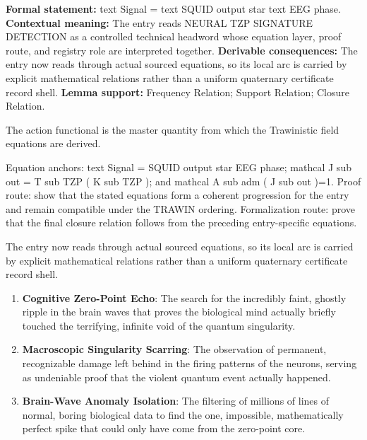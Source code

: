\begingroup\footnotesize\setlength{\emergencystretch}{3em}\sloppy
\textbf{Formal statement:} text Signal = text SQUID output star text EEG phase. \textbf{Contextual meaning:} The entry reads NEURAL TZP SIGNATURE DETECTION as a controlled technical headword whose equation layer, proof route, and registry role are interpreted together. \textbf{Derivable consequences:} The entry now reads through actual sourced equations, so its local arc is carried by explicit mathematical relations rather than a uniform quaternary certificate record shell. \textbf{Lemma support:} Frequency Relation; Support Relation; Closure Relation.\par
\endgroup

The action functional is the master quantity from which the Trawinistic field equations are derived.

Equation anchors: text Signal = SQUID output star EEG phase; mathcal J sub out = T sub TZP ( K sub TZP ); and mathcal A sub adm ( J sub out )=1. Proof route: show that the stated equations form a coherent progression for the entry and remain compatible under the TRAWIN ordering. Formalization route: prove that the final closure relation follows from the preceding entry-specific equations.

The entry now reads through actual sourced equations, so its local arc is carried by explicit mathematical relations rather than a uniform quaternary certificate record shell.
\endgroup

\begin{enumerate}[leftmargin=1.6em,itemsep=6pt,topsep=4pt]
\item \textbf{Cognitive Zero-Point Echo}: The search for the incredibly faint, ghostly ripple in the brain waves that proves the biological mind actually briefly touched the terrifying, infinite void of the quantum singularity.
\item \textbf{Macroscopic Singularity Scarring}: The observation of permanent, recognizable damage left behind in the firing patterns of the neurons, serving as undeniable proof that the violent quantum event actually happened.
\item \textbf{Brain-Wave Anomaly Isolation}: The filtering of millions of lines of normal, boring biological data to find the one, impossible, mathematically perfect spike that could only have come from the zero-point core.
\end{enumerate}

